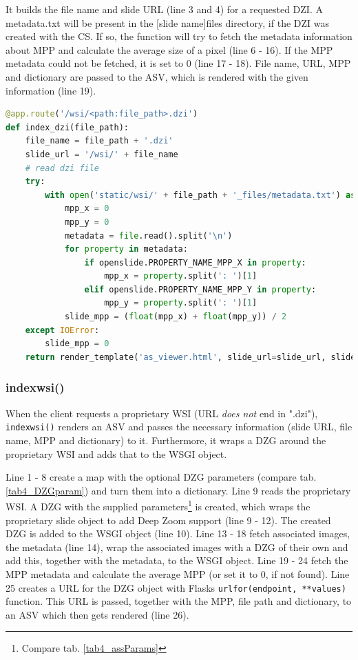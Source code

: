 It builds the file name and slide URL (line 3 and 4) for a requested DZI. A metadata.txt will be present in the [slide name]{\textunderscore}files directory, if the DZI was created with the CS. If so, the function will try to fetch the metadata information about MPP and calculate the average size of a pixel (line 6 - 16). If the MPP metadata could not be fetched, it is set to 0 (line 17 - 18). File name, URL, MPP and dictionary are passed to the ASV, which is rendered with the given information (line 19).

\begin{lstlisting}[language=Python, frame=single]
@app.route('/wsi/<path:file_path>.dzi')
def index_dzi(file_path):
	file_name = file_path + '.dzi'
	slide_url = '/wsi/' + file_name
	# read dzi file
	try:
		with open('static/wsi/' + file_path + '_files/metadata.txt') as file:
			mpp_x = 0
			mpp_y = 0
			metadata = file.read().split('\n')
			for property in metadata:
				if openslide.PROPERTY_NAME_MPP_X in property:
					mpp_x = property.split(': ')[1]
				elif openslide.PROPERTY_NAME_MPP_Y in property:
					mpp_y = property.split(': ')[1]
			slide_mpp = (float(mpp_x) + float(mpp_y)) / 2
	except IOError:
		slide_mpp = 0
	return render_template('as_viewer.html', slide_url=slide_url, slide_mpp=slide_mpp, file_name=file_name, dictionary=getDictionary(file_name))
\end{lstlisting}


\subsubsection{index{\textunderscore}wsi()}
When the client requests a proprietary WSI (URL \emph{does not} end in ".dzi"), \texttt{index{\textunderscore}wsi()} renders an ASV and passes the necessary information (slide URL, file name, MPP and dictionary) to it. Furthermore, it wraps a DZG around the proprietary WSI and adds that to the WSGI object.

Line 1 - 8 create a map with the optional DZG parameters (compare tab. \ref{tab4_DZGparam}) and turn them into a dictionary. Line 9 reads the proprietary WSI. A DZG with the supplied parameters\footnote{Compare tab. \ref{tab4_assParams}} is created, which wraps the proprietary slide object to add Deep Zoom support (line 9 - 12). The created DZG is added to the WSGI object (line 10). Line 13 - 18 fetch associated images, the metadata (line 14), wrap the associated images with a DZG of their own and add this, together with the metadata, to the WSGI object. Line 19 - 24 fetch the MPP metadata and calculate the average MPP (or set it to 0, if not found). 
Line 25 creates a URL for the DZG object with Flasks \texttt{url{\textunderscore}for(endpoint, **values)} function. This URL is passed, together with the MPP, file path and dictionary, to an ASV which then gets rendered (line 26).

